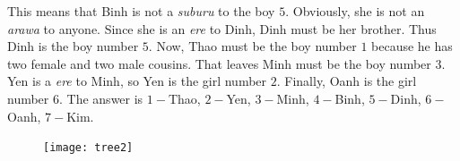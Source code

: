 \begin{multicols}{2}
		\vskip 0.1cm
		This means that Binh is not a \textit{suburu} to the boy $5.$
		Obviously, she is not an \textit{arawa} to anyone.
		Since she is an \textit{ere} to Dinh, Dinh must be her brother.
		Thus Dinh is the boy number $5.$
		\vskip 0.1cm
		Now, Thao must be the boy number $1$ because he has two female and two male cousins.
		That leaves Minh must be the boy number $3.$
		\vskip 0.1cm
		Yen is a \textit{ere} to Minh, so Yen is the girl number $2.$
		Finally, Oanh is the girl number $6.$
		\vskip 0.1cm
		The answer is $1-$Thao, $2-$Yen, $3-$Minh, $4-$Binh, $5-$Dinh, $6-$Oanh, $7-$Kim.
		\vskip 0.25cm
\end{multicols}
\begin{figure}[H]
	\vspace*{-5pt}
	\centering
	\captionsetup{labelformat= empty, justification=centering}
	\texttt{[image: tree2]}
	\vspace*{-5pt}
\end{figure}
